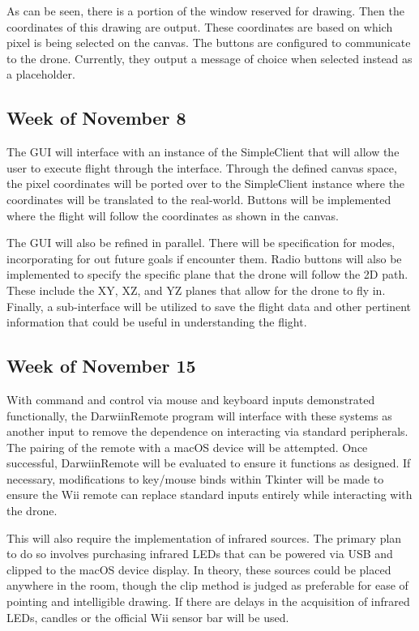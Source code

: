 \documentclass[conf]{new-aiaa}
\begin{document}
        As can be seen, there is a portion of the window reserved for drawing. Then the coordinates of this drawing are output. These coordinates are based on which pixel is being selected on the canvas. The buttons are configured to communicate to the drone. Currently, they output a message of choice when selected instead as a placeholder.
         
    \subsection{Week of November 8}
        
        The GUI will interface with an instance of the SimpleClient that will allow the user to execute flight through the interface. Through the defined canvas space, the pixel coordinates will be ported over to the SimpleClient instance where the coordinates will be translated to the real-world. Buttons will be implemented where the flight will follow the coordinates as shown in the canvas. 
        
        The GUI will also be refined in parallel. There will be specification for modes, incorporating for out future goals if encounter them. Radio buttons will also be implemented to specify the specific plane that the drone will follow the 2D path. These include the XY, XZ, and YZ planes that allow for the drone to fly in. Finally, a sub-interface will be utilized to save the flight data and other pertinent information that could be useful in understanding the flight. 
        
    \subsection{Week of November 15}
    With command and control via mouse and keyboard inputs demonstrated functionally, the DarwiinRemote program will interface with these systems as another input to remove the dependence on interacting via standard peripherals. The pairing of the remote with a macOS device will be attempted. Once successful, DarwiinRemote will be evaluated to ensure it functions as designed. If necessary, modifications to key/mouse binds within Tkinter will be made to ensure the Wii remote can replace standard inputs entirely while interacting with the drone.
    
    This will also require the implementation of infrared sources. The primary plan to do so involves purchasing infrared LEDs that can be powered via USB and clipped to the macOS device display. In theory, these sources could be placed anywhere in the room, though the clip method is judged as preferable for ease of pointing and intelligible drawing. If there are delays in the acquisition of infrared LEDs, candles or the official Wii sensor bar will be used.
    
\end{document}
